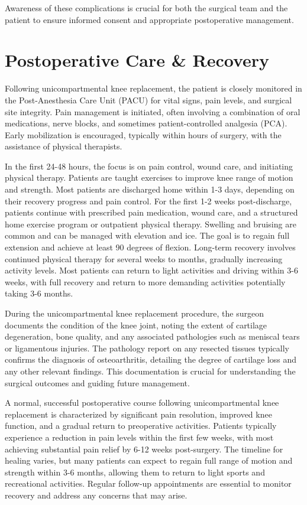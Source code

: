 Awareness of these complications is crucial for both the surgical team and the patient to ensure informed consent and appropriate postoperative management.

\section*{Postoperative Care \& Recovery}
Following unicompartmental knee replacement, the patient is closely monitored in the Post-Anesthesia Care Unit (PACU) for vital signs, pain levels, and surgical site integrity. Pain management is initiated, often involving a combination of oral medications, nerve blocks, and sometimes patient-controlled analgesia (PCA). Early mobilization is encouraged, typically within hours of surgery, with the assistance of physical therapists.

In the first 24-48 hours, the focus is on pain control, wound care, and initiating physical therapy. Patients are taught exercises to improve knee range of motion and strength. Most patients are discharged home within 1-3 days, depending on their recovery progress and pain control. For the first 1-2 weeks post-discharge, patients continue with prescribed pain medication, wound care, and a structured home exercise program or outpatient physical therapy. Swelling and bruising are common and can be managed with elevation and ice. The goal is to regain full extension and achieve at least 90 degrees of flexion. Long-term recovery involves continued physical therapy for several weeks to months, gradually increasing activity levels. Most patients can return to light activities and driving within 3-6 weeks, with full recovery and return to more demanding activities potentially taking 3-6 months.

During the unicompartmental knee replacement procedure, the surgeon documents the condition of the knee joint, noting the extent of cartilage degeneration, bone quality, and any associated pathologies such as meniscal tears or ligamentous injuries. The pathology report on any resected tissues typically confirms the diagnosis of osteoarthritis, detailing the degree of cartilage loss and any other relevant findings. This documentation is crucial for understanding the surgical outcomes and guiding future management.

A normal, successful postoperative course following unicompartmental knee replacement is characterized by significant pain resolution, improved knee function, and a gradual return to preoperative activities. Patients typically experience a reduction in pain levels within the first few weeks, with most achieving substantial pain relief by 6-12 weeks post-surgery. The timeline for healing varies, but many patients can expect to regain full range of motion and strength within 3-6 months, allowing them to return to light sports and recreational activities. Regular follow-up appointments are essential to monitor recovery and address any concerns that may arise.

